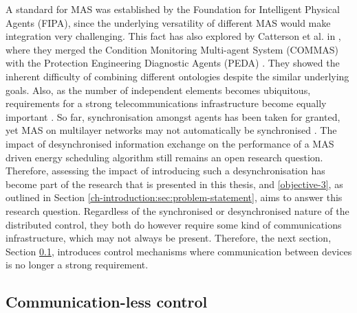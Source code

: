 A standard for MAS was established by the Foundation for Intelligent Physical Agents (FIPA), since the underlying versatility of different MAS would make integration very challenging.
This fact has also explored by Catterson et al. in \cite{Catterson2005}, where they merged the Condition Monitoring Multi-agent System (COMMAS) \cite{McArthur2004a} with the Protection Engineering Diagnostic Agents (PEDA) \cite{Hossack2003a}.
They showed the inherent difficulty of combining different ontologies despite the similar underlying goals.
Also, as the number of independent elements becomes ubiquitous, requirements for a strong telecommunications infrastructure become equally important \cite{Hatziargyriou2015}.
So far, synchronisation amongst agents has been taken for granted, yet MAS on multilayer networks may not automatically be synchronised \cite{He2017}.
The impact of desynchronised information exchange on the performance of a MAS driven energy scheduling algorithm still remains an open research question.
Therefore, assessing the impact of introducing such a desynchronisation has become part of the research that is presented in this thesis, and \ref{objective-3}, as outlined in Section \ref{ch-introduction:sec:problem-statement}, aims to answer this research question.
Regardless of the synchronised or desynchronised nature of the distributed control, they both do however require some kind of communications infrastructure, which may not always be present.
Therefore, the next section, Section \ref{ch-literature:subsec:communication-less-control}, introduces control mechanisms where communication between devices is no longer a strong requirement.

\subsection{Communication-less control}
\label{ch-literature:subsec:communication-less-control}

